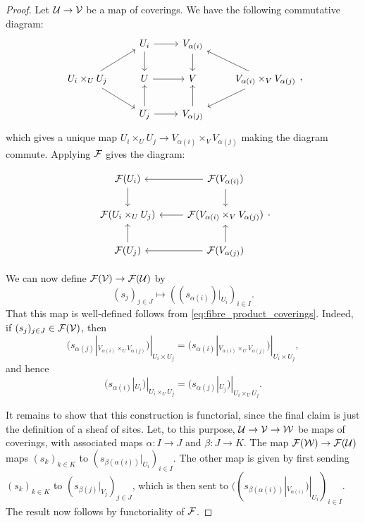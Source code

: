 \documentclass{article}
\begin{document}
\begin{proof}
    Let $\mathcal{U} \to \mathcal{V}$ be a map of coverings. We have the following
    commutative diagram:
    \begin{equation*}
        \begin{tikzcd}
            & U_i \rar \dar &V_{\alpha(i)} \dar \\
            U_i \times_U U_j \ar[ru] \ar[rd]
            & U \rar & V
            & V_{\alpha(i)} \times_V V_{\alpha(j)} \ar[lu] \ar [ld] \\
            & U_j \rar \uar & V_{\alpha(j)} \uar
        \end{tikzcd},
    \end{equation*}
    which gives a unique map $U_i \times_U U_j \to V_{\alpha(i)} \times_V V_{\alpha(j)}$
    making the diagram commute. Applying $\mathcal{F}$ gives the diagram:

    \begin{equation}\label{eq:fibre_product_coverings}
        \begin{tikzcd}
            \mcF(U_i) \dar &\mcF(V_{\alpha(i)}) \lar \dar \\
            \mcF(U_i \times_U U_j) & \mcF(V_{\alpha(i)} \times_V V_{\alpha(j)} )  \lar \\
            \mcF(U_j) \uar &\mcF(V_{\alpha(j)}) \lar \uar
        \end{tikzcd}
        .
    \end{equation}

    We can now define $\mathcal{F}(\mathcal{V}) \to \mathcal{F}(\mathcal{U})$ by
    \begin{equation*}
        (s_j)_{j\in J} \mapsto ((s_{\alpha(i)})|_{U_i})_{i\in I}.
    \end{equation*}
    That this map is well-defined follows from \cref{eq:fibre_product_coverings}.
    Indeed, if $(s_j)_{j\in J} \in \mathcal{F}(\mathcal{V})$, then
    \begin{equation*}
        (s_{\alpha(j)}|_{V_{\alpha(i)}\times_U V_{\alpha(j)}})|_{U_i \times U_j}
        = (s_{\alpha(i)}|_{V_{\alpha(i)}\times_U V_{\alpha(j)}})|_{U_i \times U_j},
    \end{equation*}
    and hence
    \begin{equation*}
        (s_{\alpha(i)}|_{U_i})|_{U_i \times_U U_j}
        = (s_{\alpha(j)}|_{U_j})|_{U_i \times_U U_j}.
    \end{equation*}

    It remains to show that this construction is functorial, since
    the final claim is just the definition of a sheaf of sites. Let,
    to this purpose, $\mathcal{U} \to \mathcal{V} \to \mathcal{W}$ be maps of coverings,
    with associated maps $\alpha\colon I \to J$ and $\beta \colon J \to K$.
    The map $\mathcal{F}(\mathcal{W}) \to \mathcal{F}(\mathcal{U})$ maps $(s_k)_{k\in K}$ to
    $(s_{\beta(\alpha(i))}|_{U_i})_{i\in I}$. The other map is given by
    first sending $(s_k)_{k \in K}$ to $(s_{\beta(j)}|_{V_j})_{j\in J}$,
    which is then sent to $((s_{\beta(\alpha(i))}|_{V_{\alpha(i)}})|_{U_i})_{i\in I}$.
    The result now follows by functoriality of $\mathcal{F}$.
\end{proof}
\end{document}
